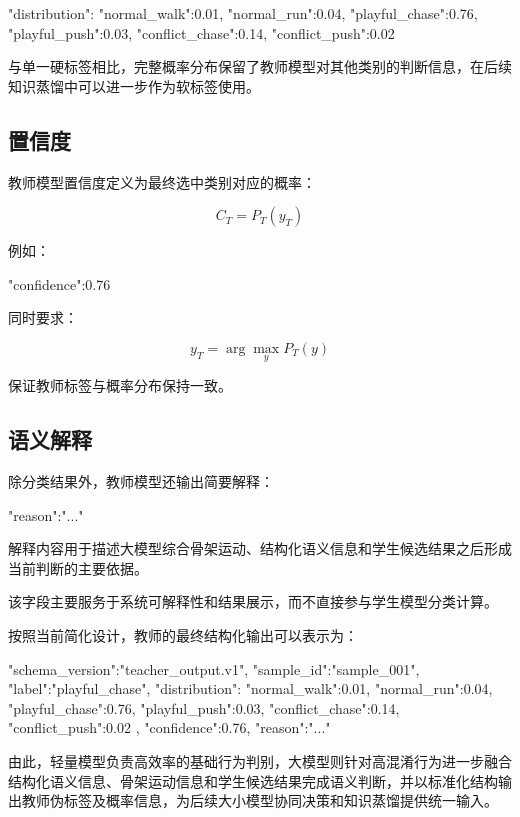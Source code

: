 \begin{NotionCode}
"distribution": {
  "normal_walk":0.01,
  "normal_run":0.04,
  "playful_chase":0.76,
  "playful_push":0.03,
  "conflict_chase":0.14,
  "conflict_push":0.02
}
\end{NotionCode}

与单一硬标签相比，完整概率分布保留了教师模型对其他类别的判断信息，在后续知识蒸馏中可以进一步作为软标签使用。

\subsection{置信度}

教师模型置信度定义为最终选中类别对应的概率：

\[
C_T=P_T(y_T)
\]

例如：

\begin{NotionCode}
"confidence":0.76
\end{NotionCode}

同时要求：

\[
y_T=
\arg\max_yP_T(y)
\]

保证教师标签与概率分布保持一致。

\subsection{语义解释}

除分类结果外，教师模型还输出简要解释：

\begin{NotionCode}
"reason":"..."
\end{NotionCode}

解释内容用于描述大模型综合骨架运动、结构化语义信息和学生候选结果之后形成当前判断的主要依据。

该字段主要服务于系统可解释性和结果展示，而不直接参与学生模型分类计算。

按照当前简化设计，教师的最终结构化输出可以表示为：

\begin{NotionCode}
{
  "schema_version":"teacher_output.v1",
  "sample_id":"sample_001",
  "label":"playful_chase",
  "distribution": {
    "normal_walk":0.01,
    "normal_run":0.04,
    "playful_chase":0.76,
    "playful_push":0.03,
    "conflict_chase":0.14,
    "conflict_push":0.02
  },
  "confidence":0.76,
  "reason":"..."
}
\end{NotionCode}

由此，轻量模型负责高效率的基础行为判别，大模型则针对高混淆行为进一步融合结构化语义信息、骨架运动信息和学生候选结果完成语义判断，并以标准化结构输出教师伪标签及概率信息，为后续大小模型协同决策和知识蒸馏提供统一输入。

